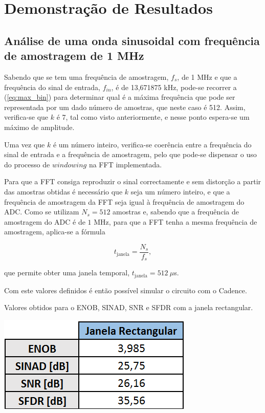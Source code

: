 \documentclass[11pt]{article}
\numberwithin{equation}{section}
\begin{document}
\section{Demonstração de Resultados}

\subsection{Análise de uma onda sinusoidal com frequência de amostragem de 1 MHz}

Sabendo que se tem uma frequência de amostragem, $f_{s}$, de 1 MHz e que a frequência do sinal de entrada, $f_{in}$, é de 13,671875 kHz, pode-se recorrer a (\ref{eq:max_bin}) para determinar qual é a máxima frequência que pode ser representada por um dado número de amostras, que neste caso é 512. Assim, verifica-se que $k$ é 7, tal como visto anteriormente, e nesse ponto espera-se um máximo de amplitude.

Uma vez que $k$ é um número inteiro, verifica-se coerência entre a frequência do sinal de entrada e a frequência de amostragem, pelo que pode-se dispensar o uso do processo de $windowing$ na FFT implementada.

Para que a FFT consiga reproduzir o sinal correctamente e sem distorção a partir das amostras obtidas é necessário que $k$ seja um número inteiro, e que a frequência de amostragem da FFT seja igual à frequência de amostragem do ADC. Como se utilizam $N_{s} = 512$ amostras e, sabendo que a frequência de amostragem do ADC é de $1$ MHz, para que a FFT tenha a mesma frequência de amostragem, aplica-se a fórmula 

\vspace{-3mm}
\begin{equation}
 	t_{\text{janela}} = \frac{N_{s}}{f_{s}},
 	\label{eq:temp_jan}
\end{equation}

\vspace{1mm}
que permite obter uma janela temporal, $t_{\text{janela}} = 512~\mu$s.

Com este valores definidos é então possível simular o circuito com o Cadence.

\begin{table}[h]
	\centering
	\caption{Valores obtidos para o ENOB, SINAD, SNR e SFDR com a janela rectangular.}
 	\includegraphics[keepaspectratio=true, scale=0.50]{lab/rect.png}
\end{table}
\end{document}
